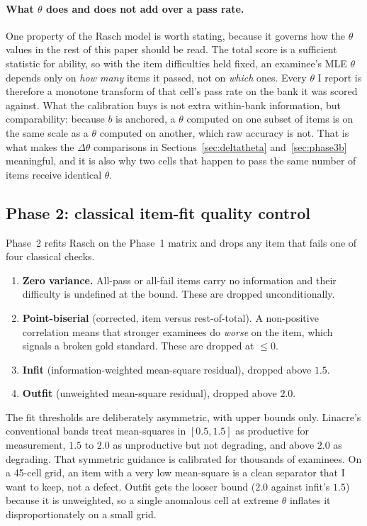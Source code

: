 \paragraph{What $\theta$ does and does not add over a pass rate.}
One property of the Rasch model is worth stating, because it governs how
the $\theta$ values in the rest of this paper should be read. The total
score is a sufficient statistic for ability, so with the item
difficulties held fixed, an examinee's MLE $\theta$ depends only on
\emph{how many} items it passed, not on \emph{which} ones. Every
$\theta$ I report is therefore a monotone transform of that cell's pass
rate on the bank it was scored against. What the calibration buys is not
extra within-bank information, but comparability: because $b$ is
anchored, a $\theta$ computed on one subset of items is on the same scale
as a $\theta$ computed on another, which raw accuracy is not. That is
what makes the $\Delta\theta$ comparisons in
Sections~\ref{sec:deltatheta} and~\ref{sec:phase3b} meaningful, and it is
also why two cells that happen to pass the same number of items receive
identical $\theta$.

\subsection{Phase 2: classical item-fit quality control}
Phase~2 refits Rasch on the Phase~1 matrix and drops any item that fails
one of four classical checks.

\begin{enumerate}[leftmargin=1.4em,topsep=2pt]
  \item \textbf{Zero variance.} All-pass or all-fail items carry no
  information and their difficulty is undefined at the bound. These are
  dropped unconditionally.
  \item \textbf{Point-biserial} (corrected, item versus rest-of-total).
  A non-positive correlation means that stronger examinees do
  \emph{worse} on the item, which signals a broken gold standard. These
  are dropped at $\le 0$.
  \item \textbf{Infit} (information-weighted mean-square residual),
  dropped above $1.5$.
  \item \textbf{Outfit} (unweighted mean-square residual), dropped above
  $2.0$.
\end{enumerate}

The fit thresholds are deliberately asymmetric, with upper bounds only.
Linacre's conventional bands \citep{linacre2002infit} treat mean-squares
in $[0.5, 1.5]$ as productive for measurement, $1.5$ to $2.0$ as
unproductive but not degrading, and above $2.0$ as degrading. That
symmetric guidance is calibrated for thousands of examinees. On a 45-cell
grid, an item with a very low mean-square is a clean separator that I
want to keep, not a defect. Outfit gets the looser bound ($2.0$ against
infit's $1.5$) because it is unweighted, so a single anomalous cell at
extreme $\theta$ inflates it disproportionately on a small grid.

